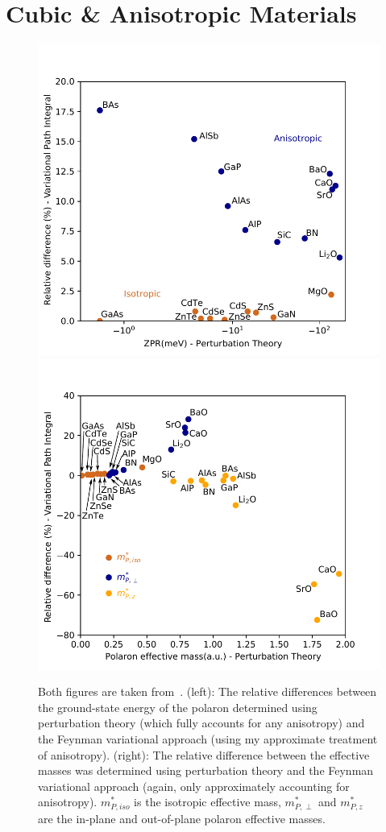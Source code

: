 
\section{Cubic \& Anisotropic Materials}
\label{sec:chap-sixth-third}

\begin{figure}[t]
    \centering
    \includegraphics[width=.49\textwidth]{figures/ff_zpr.pdf}
    \includegraphics[width=.49\textwidth]{figures/ff_emass.pdf}
    
    \caption{Both figures are taken from~\cite{guster_frohlich_2021}. (left): The relative differences between the ground-state energy of the polaron determined using perturbation theory (which fully accounts for any anisotropy) and the Feynman variational approach (using my approximate treatment of anisotropy). (right): The relative difference between the effective masses was determined using perturbation theory and the Feynman variational approach (again, only approximately accounting for anisotropy). $m^*_{P, iso}$ is the isotropic effective mass, $m^*_{P, \perp}$ and $m^*_{P, z}$ are the in-plane and out-of-plane polaron effective masses.}
    \label{fig:anisotropy}
\end{figure}

